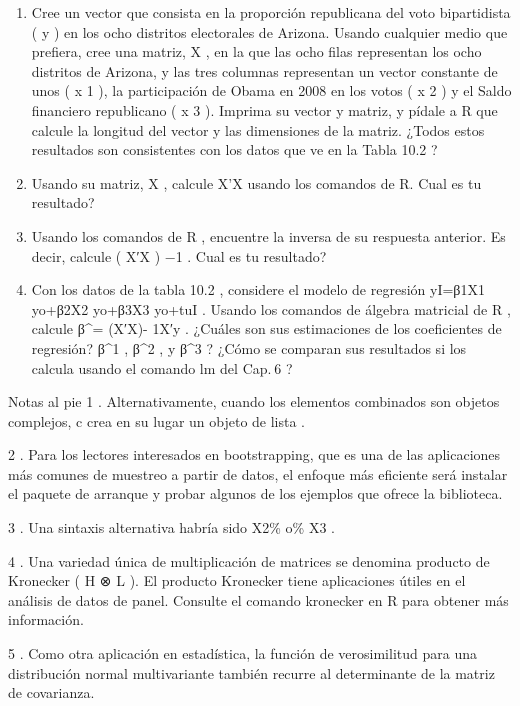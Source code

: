 \documentclass[
]{book}
\begin{document}
\begin{enumerate}
\def\labelenumi{\arabic{enumi}.}
\item
  Cree un vector que consista en la proporción republicana del voto bipartidista ( y ) en los ocho distritos electorales de Arizona. Usando cualquier medio que prefiera, cree una matriz, X , en la que las ocho filas representan los ocho distritos de Arizona, y las tres columnas representan un vector constante de unos ( x 1 ), la participación de Obama en 2008 en los votos ( x 2 ) y el Saldo financiero republicano ( x 3 ). Imprima su vector y matriz, y pídale a R que calcule la longitud del vector y las dimensiones de la matriz. ¿Todos estos resultados son consistentes con los datos que ve en la Tabla 10.2 ?
\item
  Usando su matriz, X , calcule X'X usando los comandos de R. Cual es tu resultado?
\item
  Usando los comandos de R , encuentre la inversa de su respuesta anterior. Es decir, calcule ( X′X ) −1 . Cual es tu resultado?
\item
  Con los datos de la tabla 10.2 , considere el modelo de regresión yI=β1X1 yo+β2X2 yo+β3X3 yo+tuI . Usando los comandos de álgebra matricial de R , calcule β\^{}= (X′X)- 1X′y . ¿Cuáles son sus estimaciones de los coeficientes de regresión? β\^{}1 , β\^{}2 , y β\^{}3 ? ¿Cómo se comparan sus resultados si los calcula usando el comando lm del Cap. 6 ?
\end{enumerate}

Notas al pie
1 .
Alternativamente, cuando los elementos combinados son objetos complejos, c crea en su lugar un objeto de lista .

2 .
Para los lectores interesados \hspace{0pt}\hspace{0pt}en bootstrapping, que es una de las aplicaciones más comunes de muestreo a partir de datos, el enfoque más eficiente será instalar el paquete de arranque y probar algunos de los ejemplos que ofrece la biblioteca.

3 .
Una sintaxis alternativa habría sido X2\% o\% X3 .

4 .
Una variedad única de multiplicación de matrices se denomina producto de Kronecker ( H ⊗ L ). El producto Kronecker tiene aplicaciones útiles en el análisis de datos de panel. Consulte el comando kronecker en R para obtener más información.

5 .
Como otra aplicación en estadística, la función de verosimilitud para una distribución normal multivariante también recurre al determinante de la matriz de covarianza.
\end{document}
